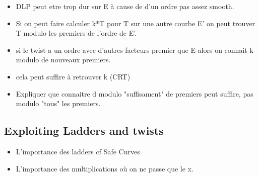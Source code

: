 \documentclass[10pt]{article}
\theoremstyle{definition}
\begin{document}
\begin{itemize}
\item DLP peut etre trop dur sur E à cause de d'un ordre pas assez smooth.
\item Si on peut faire calculer k*T pour T sur une autre courbe E' on peut trouver T modulo les premiers de l'ordre de E'.
\item si le twist a un ordre avec d'autres facteurs premier que E alors on connait k modulo de nouveaux premiers. 
\item cela peut suffire à retrouver k (CRT)
\item Expliquer que connaitre d modulo "suffisament" de premiers peut suffire, pas modulo "tous" les premiers.
\end{itemize}

\subsection{Exploiting Ladders and twists}
\begin{itemize}
\item L'importance des ladders cf Safe Curves
\item L'importance des multiplications où on ne passe que le x.
\end{itemize}




\end{document}

